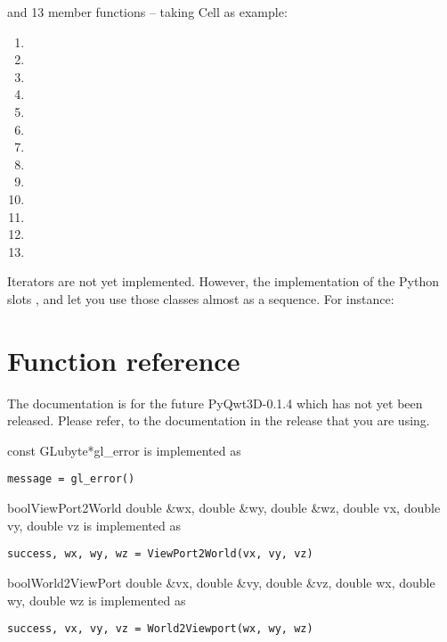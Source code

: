 \documentclass{manual}
\newcommand{\Future}{
  \begin{notice}[warning]
    The documentation is for the future PyQwt3D-0.1.4 which has not yet been
    released.  Please refer, to the documentation in the release that you are
    using.
  \end{notice}
}
\begin{document}
and 13 member functions -- taking Cell as example:
\begin{enumerate}
\item
\item
\item
\item
\item
\item
\item
\item
\item
\item
\item
\item
\item
\end{enumerate}

Iterators are not yet implemented. However, the implementation of the
Python slots ,  and
 let you use those classes almost as a sequence.
For instance:



\section{Function reference \label{functions}}

\Future{}

\begin{cfuncdesc}{const GLubyte*}{gl_error}{}
  is implemented as
  \begin{verbatim}
message = gl_error()
  \end{verbatim}
\end{cfuncdesc}

\begin{cfuncdesc}{bool}{ViewPort2World}
  {double \&wx, double \&wy, double \&wz, double vx, double vy, double vz}
  is implemented as
  \begin{verbatim}
success, wx, wy, wz = ViewPort2World(vx, vy, vz)
  \end{verbatim}
\end{cfuncdesc}

\begin{cfuncdesc}{bool}{World2ViewPort}
  {double \&vx, double \&vy, double \&vz, double wx, double wy, double wz}
  is implemented as
  \begin{verbatim}
success, vx, vy, vz = World2Viewport(wx, wy, wz)
  \end{verbatim}
\end{cfuncdesc}



\end{document}
